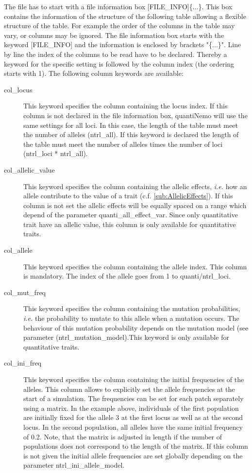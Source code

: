 \documentclass[letterpaper,12pt,oneside]{book}
\begin{document}
\begin{description}
The file has to start with a file information box \textsf{[FILE\_INFO]}\{...\}. This box contains the information of the structure of the following table allowing a flexible structure of the table. For example the order of the columns in the table may vary, or columns may be ignored. The file information box starts with the keyword \textsf{[FILE\_INFO]} and the information is enclosed by brackets "\{...\}". Line by line the index of the columns to be read have to be declared. Thereby a keyword for the specific setting is followed by the column index (the ordering starts with 1). The following column keywords are available:
\begin{description}
\item [col\_locus] This keyword specifies the column containing the locus index. If this column is not declared in the file information box, quantiNemo will use the same settings for all loci. In this case, the length of the table must meet the number of alleles (\textsf{ntrl\_all}). If this keyword is declared the length of the table must meet the number of alleles times the number of loci (\textsf{ntrl\_loci} * \textsf{ntrl\_all}).   
\item [col\_allelic\_value] This keyword specifies the column containing the allelic effects, \textit{i.e.} how an allele contribute to the value of a trait (c.f. \ref{sub:AllelicEffects}). If this column is not set the allelic effects will be equally spaced on a range which depend of the parameter \textsf{quanti\_all\_effect\_var}. Since only quantitative trait have an allelic value, this column is only available for quantitative traits.
\item [col\_allele] This keyword specifies the column containing the allele index. This column is mandatory. The index of the allele goes from 1 to \textsf{quanti/ntrl\_loci}.
\item [col\_mut\_freq] This keyword specifies the column containing the mutation probabilities, \textit{i.e.} the probability to mutate to this allele when a mutation occurs. The behaviour of this mutation probability depends on the mutation model (see parameter (\textsf{ntrl\_mutation\_model}).This keyword is only available for quantitative traits. 
\item [col\_ini\_freq] This keyword specifies the column containing the initial frequencies of the alleles. This column allows to explicitly set the allele frequencies at the start of a simulation. The frequencies can be set for each patch separately using a matrix. In the example above, individuals of the first population are initially fixed for the allele 3 at the first locus as well as at the second locus. In the second population, all alleles have the same initial frequency of 0.2. Note, that the matrix is adjusted in length if the number of populations does not correspond to the length of the matrix. If this column is not given the initial allele frequencies are set globally depending on the parameter \textsf{ntrl\_ini\_allele\_model}.

\end{description}
\end{description}
\end{document}
